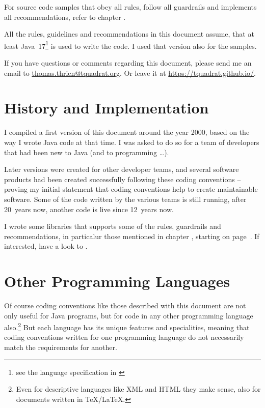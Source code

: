 For source code samples that obey all rules, follow all guardrails and implements all recommendations, refer to chapter .

All the rules, guidelines and recommendations in this document assume, that at least Java~17\footnote{see the language specification in \autocite{ORACLE_DOC_LANGUAGE_SPECIFICATION}} is used to write the code. I used that version also for the samples.

If you have questions or comments regarding this document, please send me an email to \href{mailto:thomas.thrien@tquadrat.org}{thomas.thrien@tquadrat.org}. Or leave it at \url{https://tquadrat.github.io/}.

\section{History and Implementation}
I compiled a first version of this document around the year 2000, based on the way I wrote Java code at that time. I was asked to do so for a team of developers that had been new to Java (and to programming …).

Later versions were created for other developer teams, and several software products had been created successfully following these coding conventions – proving my initial statement that coding conventions help to create maintainable software. Some of the code written by the various teams is still running, after 20~years now, another code is live since 12~years now.

I wrote some libraries that supports some of the rules, guardrails and recommendations, in particalur those mentioned in chapter , starting on page~\pageref{sec:CodingRules}. If interested, have a look to \autocite{TQUADRAT_ORG}.

\section{Other Programming Languages}\label{sec:OtherProgrammingLanguages}
Of course coding conventions like those described with this document are not only useful for Java programs, but for code in any other programming language also.\footnote{Even for descriptive languages like XML and HTML they make sense, also for documents written in \TeX/\LaTeX.} But each language has its unique features and specialities, meaning that coding conventions written for one programming language do not necessarily match the requirements for another.

